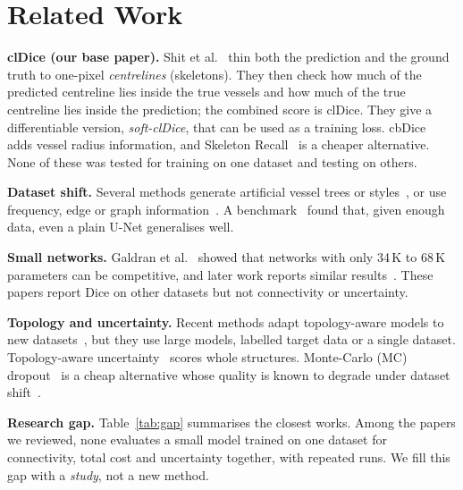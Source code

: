 \documentclass[conference]{IEEEtran}
\begin{document}
\section{Related Work}
\textbf{clDice (our base paper).} Shit et al.~\cite{shit2021} thin both the prediction and the ground truth to one-pixel \emph{centrelines} (skeletons). They then check how much of the predicted centreline lies inside the true vessels and how much of the true centreline lies inside the prediction; the combined score is clDice. They give a differentiable version, \emph{soft-clDice}, that can be used as a training loss. cbDice~\cite{shi2024} adds vessel radius information, and Skeleton Recall~\cite{kirchhoff2024} is a cheaper alternative. None of these was tested for training on one dataset and testing on others.

\textbf{Dataset shift.} Several methods generate artificial vessel trees or styles~\cite{liu2026dgssa}, or use frequency, edge or graph information~\cite{wang2026wavernet,hu2024hessian,liu2025graphseg}. A benchmark~\cite{fadugba2024} found that, given enough data, even a plain U-Net generalises well.

\textbf{Small networks.} Galdran et al.~\cite{galdran2022} showed that networks with only 34\,K to 68\,K parameters can be competitive, and later work reports similar results~\cite{zeng2025,sobhan2026}. These papers report Dice on other datasets but not connectivity or uncertainty.

\textbf{Topology and uncertainty.} Recent methods adapt topology-aware models to new datasets~\cite{zhou2025,khazem2026,huang2026,ahmed2026}, but they use large models, labelled target data or a single dataset. Topology-aware uncertainty~\cite{gupta2023} scores whole structures. Monte-Carlo (MC) dropout~\cite{gal2016} is a cheap alternative whose quality is known to degrade under dataset shift~\cite{ovadia2019}.

\textbf{Research gap.} Table~\ref{tab:gap} summarises the closest works. Among the papers we reviewed, none evaluates a small model trained on one dataset for connectivity, total cost and uncertainty together, with repeated runs. We fill this gap with a \emph{study}, not a new method.
\end{document}
